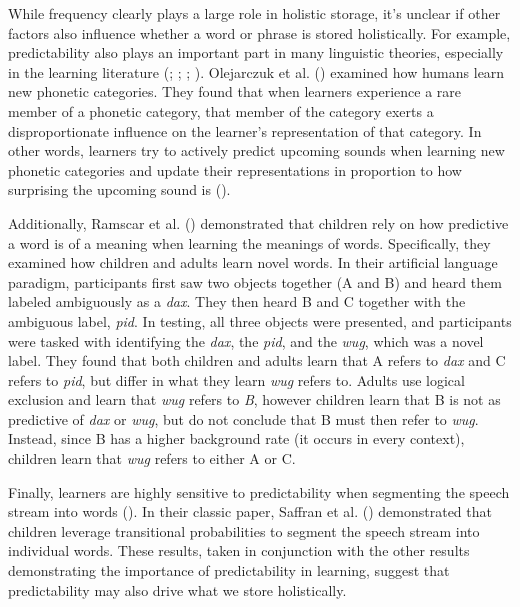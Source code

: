 \documentclass[
  12pt,
  letterpaper,
]{scrreprt}
\begin{document}
While frequency clearly plays a large role in holistic storage, it's
unclear if other factors also influence whether a word or phrase is
stored holistically. For example, predictability also plays an important
part in many linguistic theories, especially in the learning literature
(;
;
; ). Olejarczuk et al.
()
examined how humans learn new phonetic categories. They found that when
learners experience a rare member of a phonetic category, that member of
the category exerts a disproportionate influence on the learner's
representation of that category. In other words, learners try to
actively predict upcoming sounds when learning new phonetic categories
and update their representations in proportion to how surprising the
upcoming sound is
().

Additionally, Ramscar et al.
()
demonstrated that children rely on how predictive a word is of a meaning
when learning the meanings of words. Specifically, they examined how
children and adults learn novel words. In their artificial language
paradigm, participants first saw two objects together (A and B) and
heard them labeled ambiguously as a \emph{dax}. They then heard B and C
together with the ambiguous label, \emph{pid}. In testing, all three
objects were presented, and participants were tasked with identifying
the \emph{dax}, the \emph{pid}, and the \emph{wug}, which was a novel
label. They found that both children and adults learn that A refers to
\emph{dax} and C refers to \emph{pid}, but differ in what they learn
\emph{wug} refers to. Adults use logical exclusion and learn that
\emph{wug} refers to \emph{B}, however children learn that B is not as
predictive of \emph{dax} or \emph{wug}, but do not conclude that B must
then refer to \emph{wug}. Instead, since B has a higher background rate
(it occurs in every context), children learn that \emph{wug} refers to
either A or C.

Finally, learners are highly sensitive to predictability when segmenting
the speech stream into words
(). In their classic paper, Saffran et al.
()
demonstrated that children leverage transitional probabilities to
segment the speech stream into individual words. These results, taken in
conjunction with the other results demonstrating the importance of
predictability in learning, suggest that predictability may also drive
what we store holistically.
\end{document}
